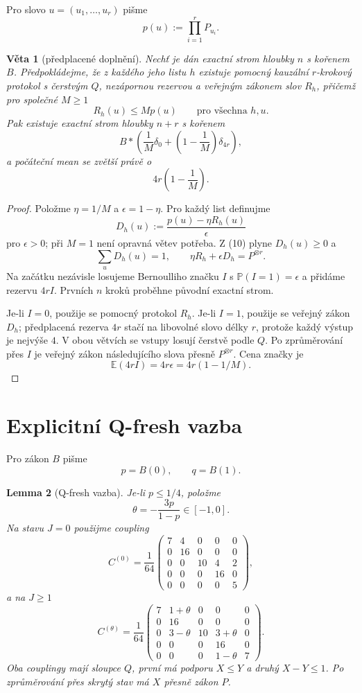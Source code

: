 \documentclass[11pt,a4paper]{article}
\newtheorem{theorem}{Věta}
\newtheorem{lemma}[theorem]{Lemma}
\theoremstyle{definition}
\theoremstyle{remark}
\theoremstyle{plain}
\newcommand{\E}{\mathbb E}
\newcommand{\Prb}{\mathbb P}
\begin{document}
Pro slovo $u=(u_1,\dots,u_r)$ pišme
\[
p(u):=\prod_{i=1}^r P_{u_i}.
\]

\begin{theorem}[předplacené doplnění]
Nechť je dán exactní strom hloubky $n$ s kořenem $B$. Předpokládejme,
že z každého jeho listu $h$ existuje pomocný kauzální $r$-krokový
protokol s čerstvým $Q$, nezápornou rezervou a veřejným zákonem slov
$R_h$, přičemž pro společné $M\ge1$
\[
R_h(u)\le M p(u)
\qquad\text{pro všechna }h,u.
\tag{10}
\]
Pak existuje exactní strom hloubky $n+r$ s kořenem
\[
B*\left(\frac1M\delta_0+
\left(1-\frac1M\right)\delta_{4r}\right),
\]
a počáteční mean se zvětší právě o
\[
\boxed{
4r\left(1-\frac1M\right).
}
\tag{11}
\]
\end{theorem}

\begin{proof}
Položme $\eta=1/M$ a $\epsilon=1-\eta$. Pro každý list definujme
\[
D_h(u):=
\frac{p(u)-\eta R_h(u)}{\epsilon}
\]
pro $\epsilon>0$; při $M=1$ není opravná větev potřeba.
Z (10) plyne $D_h(u)\ge0$ a
\[
\sum_uD_h(u)=1,\qquad
\eta R_h+\epsilon D_h=P^{\otimes r}.
\]
Na začátku nezávisle losujeme Bernoulliho značku $I$ s
$\Prb(I=1)=\epsilon$ a přidáme rezervu $4rI$.
Prvních $n$ kroků proběhne původní exactní strom.

Je-li $I=0$, použije se pomocný protokol $R_h$.
Je-li $I=1$, použije se veřejný zákon $D_h$; předplacená rezerva
$4r$ stačí na libovolné slovo délky $r$, protože každý výstup je
nejvýše $4$. V obou větvích se vstupy losují čerstvě podle $Q$.
Po zprůměrování přes $I$ je veřejný zákon následujícího slova
přesně $P^{\otimes r}$. Cena značky je
\[
\E(4rI)=4r\epsilon=4r(1-1/M).
\]
\end{proof}

\section{Explicitní Q-fresh vazba}

Pro zákon $B$ pišme
\[
p=B(0),\qquad q=B(1).
\]

\begin{lemma}[Q-fresh vazba]
Je-li $p\le1/4$, položme
\[
\theta=-\frac{3p}{1-p}\in[-1,0].
\]
Na stavu $J=0$ použijme coupling
\[
C^{(0)}=\frac1{64}
\begin{pmatrix}
7&4&0&0&0\\
0&16&0&0&0\\
0&0&10&4&2\\
0&0&0&16&0\\
0&0&0&0&5
\end{pmatrix},
\]
a na $J\ge1$
\[
C^{(\theta)}=\frac1{64}
\begin{pmatrix}
7&1+\theta&0&0&0\\
0&16&0&0&0\\
0&3-\theta&10&3+\theta&0\\
0&0&0&16&0\\
0&0&0&1-\theta&7
\end{pmatrix}.
\]
Oba couplingy mají sloupce $Q$, první má podporu $X\le Y$ a druhý
$X-Y\le1$. Po zprůměrování přes skrytý stav má $X$ přesně zákon $P$.
\end{lemma}
\end{document}
